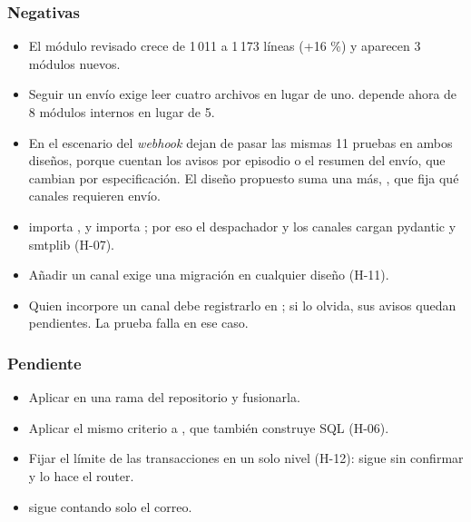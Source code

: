 \documentclass[11pt,a4paper]{article}
\begin{document}
\subsubsection*{Negativas}

\begin{itemize}
  \item {} El módulo revisado crece de 1\,011 a 1\,173 líneas (+16 \%) y aparecen 3 módulos nuevos.
  \item {} Seguir un envío exige leer cuatro archivos en lugar de uno.  depende ahora de 8 módulos internos en lugar de 5.
  \item {} En el escenario del \emph{webhook} dejan de pasar las mismas 11 pruebas en ambos diseños, porque cuentan los avisos por episodio o el resumen del envío, que cambian por especificación. El diseño propuesto suma una más, , que fija qué canales requieren envío.
  \item {}  importa , y  importa ; por eso el despachador y los canales cargan pydantic y smtplib (H-07).
  \item {} Añadir un canal exige una migración en cualquier diseño (H-11).
  \item Quien incorpore un canal debe registrarlo en ; si lo olvida, sus avisos quedan pendientes. La prueba  falla en ese caso.
\end{itemize}

\subsubsection*{Pendiente}

\begin{itemize}
  \item Aplicar  en una rama del repositorio y fusionarla.
  \item Aplicar el mismo criterio a , que también construye SQL (H-06).
  \item Fijar el límite de las transacciones en un solo nivel (H-12):  sigue sin confirmar y lo hace el router.
  \item {} sigue contando solo el correo.
\end{itemize}
\end{document}
